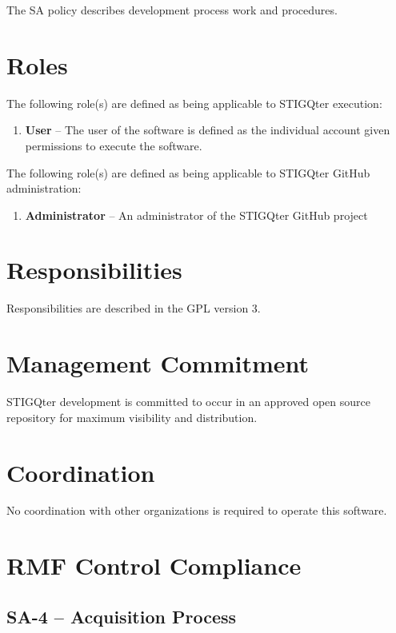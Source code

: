 \documentclass[letterpaper, 10pt, twoside]{article}
\begin{document}
The SA policy describes development process work and procedures.

\section{Roles}
\label{sec:roles}

The following role(s) are defined as being applicable to STIGQter execution:
\begin{enumerate}
	\item \textbf{User} -- The user of the software is defined as the individual account given permissions to execute the software.
\end{enumerate}

The following role(s) are defined as being applicable to STIGQter GitHub administration:
\begin{enumerate}
	\item \textbf{Administrator} -- An administrator of the STIGQter GitHub project
\end{enumerate}

\section{Responsibilities}
\label{sec:responsibilities}

Responsibilities are described in the GPL version 3.

\section{Management Commitment}

STIGQter development is committed to occur in an approved open source repository for maximum visibility and distribution.

\section{Coordination}

No coordination with other organizations is required to operate this software.

\section{RMF Control Compliance}

\subsection{SA-4 -- Acquisition Process}
\end{document}
